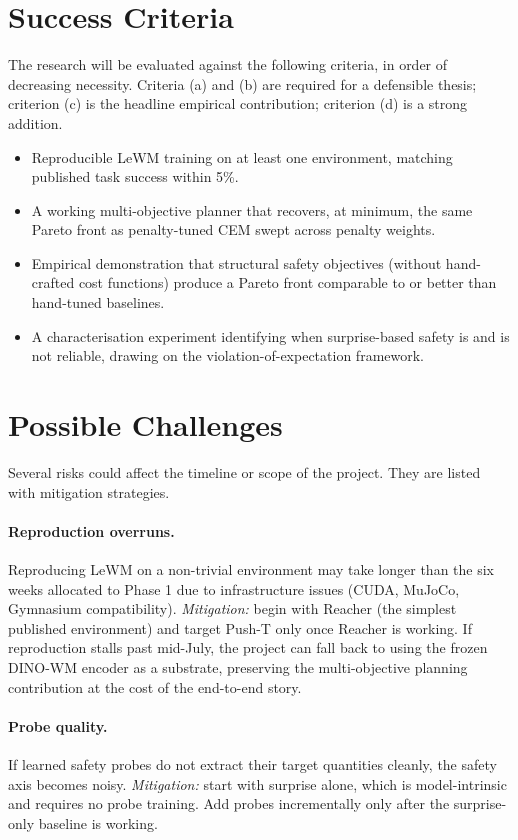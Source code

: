 \documentclass[a4paper,twoside,12pt]{report}
\begin{document}
\section{Success Criteria}

The research will be evaluated against the following criteria, in order of decreasing necessity. Criteria (a) and (b) are required for a defensible thesis; criterion (c) is the headline empirical contribution; criterion (d) is a strong addition.

\begin{itemize}
    \item[(a)] Reproducible LeWM training on at least one environment, matching published task success within 5\%.
    \item[(b)] A working multi-objective planner that recovers, at minimum, the same Pareto front as penalty-tuned CEM swept across penalty weights.
    \item[(c)] Empirical demonstration that structural safety objectives (without hand-crafted cost functions) produce a Pareto front comparable to or better than hand-tuned baselines.
    \item[(d)] A characterisation experiment identifying when surprise-based safety is and is not reliable, drawing on the violation-of-expectation framework.
\end{itemize}

\section{Possible Challenges}

Several risks could affect the timeline or scope of the project. They are listed with mitigation strategies.

\paragraph{Reproduction overruns.} Reproducing LeWM on a non-trivial environment may take longer than the six weeks allocated to Phase 1 due to infrastructure issues (CUDA, MuJoCo, Gymnasium compatibility). \emph{Mitigation:} begin with Reacher (the simplest published environment) and target Push-T only once Reacher is working. If reproduction stalls past mid-July, the project can fall back to using the frozen DINO-WM encoder \citep{zhou2025dinowm} as a substrate, preserving the multi-objective planning contribution at the cost of the end-to-end story.

\paragraph{Probe quality.} If learned safety probes do not extract their target quantities cleanly, the safety axis becomes noisy. \emph{Mitigation:} start with surprise alone, which is model-intrinsic and requires no probe training. Add probes incrementally only after the surprise-only baseline is working.
\end{document}
